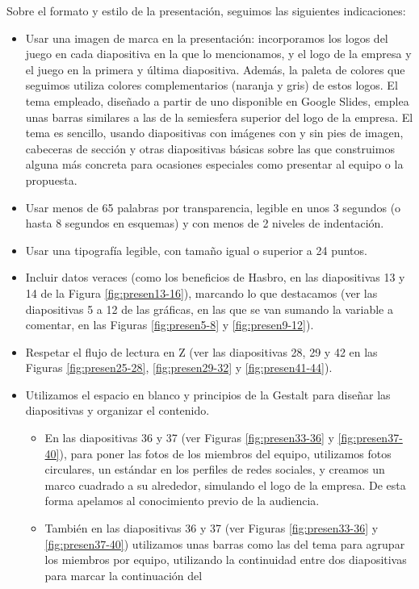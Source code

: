 Sobre el formato y estilo de la presentación, seguimos las siguientes indicaciones:
\begin{itemize}
\item Usar una imagen de marca en la presentación: incorporamos los logos del 
juego en cada diapositiva en la que lo mencionamos, y el logo de la empresa y el
juego en la primera y última diapositiva. Además, la paleta de colores que seguimos
utiliza colores complementarios (naranja y gris) de estos logos. El tema empleado,
diseñado a partir de uno disponible en Google Slides, emplea unas barras similares a
las de la semiesfera superior del logo de la empresa. El tema es sencillo, usando
diapositivas con imágenes con y sin pies de imagen, cabeceras de sección y otras
diapositivas básicas sobre las que construimos alguna más concreta para ocasiones
especiales como presentar al equipo o la propuesta.
\item Usar menos de 65 palabras por transparencia, legible en unos 3 segundos
(o hasta 8 segundos en esquemas) y con menos de 2 niveles de indentación.
\item Usar una tipografía legible, con tamaño igual o superior a 24 puntos.
\item Incluir datos veraces (como los beneficios de Hasbro, en las 
diapositivas 13 y 14 de la Figura \ref{fig:presen13-16}), 
marcando lo que destacamos (ver las diapositivas 5 a 12
de las gráficas, en las que se van sumando la variable a comentar, en las Figuras 
\ref{fig:presen5-8} y \ref{fig:presen9-12}). 
\item Respetar el flujo de lectura en Z (ver las diapositivas 28, 29 y 42 en las Figuras 
		\ref{fig:presen25-28}, \ref{fig:presen29-32} y \ref{fig:presen41-44}).
\item Utilizamos el espacio en blanco y principios de la Gestalt para diseñar las 
diapositivas y organizar el contenido. 
\begin{itemize}
\item En las diapositivas 36 y 37 (ver Figuras \ref{fig:presen33-36} y \ref{fig:presen37-40}), 
para poner las fotos de los miembros del
equipo, utilizamos fotos circulares, un estándar en los perfiles de redes
sociales, y creamos un marco cuadrado a su alrededor, simulando el logo de la empresa.
De esta forma apelamos al conocimiento previo de la audiencia.
\item También en las diapositivas 36 y 37 (ver Figuras \ref{fig:presen33-36} y \ref{fig:presen37-40}) 
utilizamos unas barras como las del tema para agrupar los miembros por equipo,
utilizando la continuidad entre dos diapositivas para marcar la continuación del

\end{itemize}
\end{itemize}
